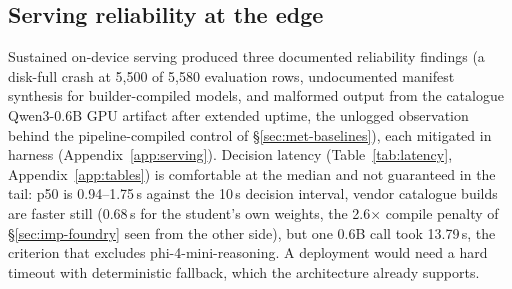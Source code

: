 \subsection{Serving reliability at the edge}\label{sec:res-reliability}
Sustained on-device serving produced three documented reliability
findings (a disk-full crash at 5{,}500 of 5{,}580 evaluation rows,
undocumented manifest synthesis for builder-compiled models, and malformed
output from the catalogue Qwen3-0.6B GPU artifact after extended uptime,
the unlogged observation behind the pipeline-compiled control of
\S\ref{sec:met-baselines}), each mitigated in harness
(Appendix~\ref{app:serving}). Decision latency (Table~\ref{tab:latency},
Appendix~\ref{app:tables}) is comfortable at the median and not guaranteed
in the tail: p50 is 0.94--1.75\,s against the 10\,s decision interval,
vendor catalogue builds are faster still (0.68\,s for the student's own
weights, the 2.6$\times$ compile penalty of \S\ref{sec:imp-foundry} seen
from the other side), but one 0.6B call took 13.79\,s, the criterion that
excludes phi-4-mini-reasoning. A deployment would need a hard timeout with
deterministic fallback, which the architecture already supports.
